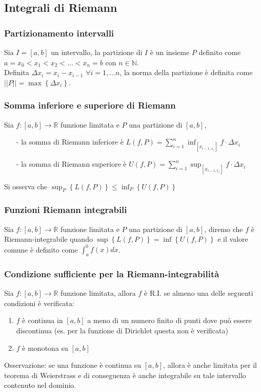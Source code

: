 \documentclass[a4paper]{article}
\begin{document}
\subsection{Integrali di Riemann}
\subsubsection*{Partizionamento intervalli}
Sia \(I = \left[a, b\right]\) un intervallo, la partizione di \(I\) è un insieme \(P\) definito come
\(a = x_0 < x_1 < x_2 < \dots < x_n = b \) con \(n \in \mathbb{N}\). \\
Definita \(\Delta x_i = x_i - x_{i-1}\) \(\forall i = 1, \dots n\), la norma della partizione è definita
come \(\left|\left|P\right|\right| = \max \left\{\Delta x_i\right\}\).

\subsubsection*{Somma inferiore e superiore di Riemann}
Sia \(f:\left[a, b\right] \to \mathbb{R}\) funzione limitata e \(P\) una partizione di \(\left[a, b\right]\),
\begin{itemize}
	\item[-] la somma di Riemann inferiore è \(\displaystyle L(f, P) = \sum_{i=1}^{n} \inf_{\left[x_{i-1,x_i}\right]} f \cdot \Delta x_i\)
	\item[-] la somma di Riemann superiore è \(\displaystyle U(f, P) = \sum_{i=1}^{n} \sup_{\left[x_{i-1,x_i}\right]} f \cdot \Delta x_i\)
\end{itemize}
Si osserva che \(\sup_{P} \left\{L(f,P)\right\} \leq \inf_{P} \left\{U(f,P)\right\}\)

\subsubsection*{Funzioni Riemann integrabili}
Sia \(f:\left[a, b\right] \to \mathbb{R}\) funzione limitata e \(P\) una partizione di \(\left[a, b\right]\),
diremo che \(f\) è Riemann-integrabile quando \(\sup \left\{L(f,P)\right\} = \inf \left\{U(f,P)\right\}\) e
il valore comune è definito come \(\displaystyle \int_{a}^{b} f(x) dx\).

\subsubsection*{Condizione sufficiente per la Riemann-integrabilità}
Sia \(f:\left[a, b\right] \to \mathbb{R}\) funzione limitata, allora \(f\) è R.I. se almeno una delle seguenti condizioni è verificata:
\begin{enumerate}
	\item \(f\) è continua in \(\left[a, b\right]\) a meno di un numero finito di punti dove può essere discontinua (es. per la funzione di Dirichlet questa non è verificata)
	\item \(f\) è monotona su \(\left[a, b\right]\)
\end{enumerate}
Osservazione: se una funzione è continua su \(\left[a, b\right]\), allora è anche limitata per il teorema di Weierstrass e di conseguenza
è anche integrabile su tale intervallo contenuto nel dominio.
\end{document}

